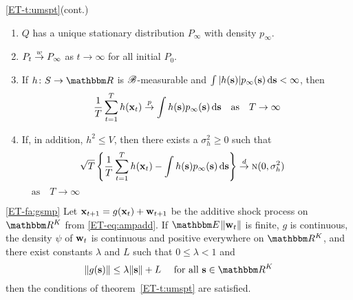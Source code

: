 \begin{frame}

    \vspace{2em}
    \Thm\eqref{ET-t:umspt}(cont.) 
    \begin{enumerate}
        \item $Q$ has a unique stationary distribution $P_\infty$ with
            density $p_\infty$.
        \item $P_t \stackrel { w } {\to} P_\infty$ as $t \to \infty$ for all initial $P_0$.
        \item  If $h \colon S \to \RR$ is $\mathscr B$-measurable 
            and $\int |h({\mathbf s})| p_{\infty}({\mathbf s})\mathop{}\!\mathrm{d} {\mathbf s} < \infty$,
            then
            \begin{equation}
                \label{eq:mllnr}
                \frac{1}{T} \sum_{t=1}^T h({\mathbf x}_t) 
                \stackrel { p } {\to} 
                \int h({\mathbf s}) p_{\infty}({\mathbf s}) \mathop{}\!\mathrm{d} {\mathbf s}
                \quad \text{as} \quad
                T \to \infty
            \end{equation}
        \item If, in addition, $h^2 \leq V$, then there exists a 
            $\sigma^2_h \geq 0$ such that 
            \begin{equation}
                \label{eq:mkclt}
                \sqrt{T}
                \left\{
                    \frac{1}{T} \sum_{t=1}^T h({\mathbf x}_t) -
                    \int h({\mathbf s}) p_{\infty}({\mathbf s}) \mathop{}\!\mathrm{d} {\mathbf s}
                \right\}
                \stackrel { d } {\to} \textrm{\sc n}(0, \sigma^2_h)
                \quad 
            \end{equation}
            $\quad \text{as}\quad 
                T \to \infty$
    \end{enumerate}
\end{frame}



\begin{frame}

    \vspace{2em}
    \Fact\eqref{ET-fa:gsmp}
        \label{fa:gsmp}
        Let ${\mathbf x}_{t+1} = g({\mathbf x}_t) + {\mathbf w}_{t+1}$ be the additive shock
        process on $\RR^K$ from \eqref{ET-eq:ampadd}.  If $\EE \|\boldw_t\|$ is
        finite, $g$ is continuous, the density $\psi$ of ${\mathbf w}_t$ is continuous
        and positive everywhere on $\RR^K$, and there exist constants $\lambda$
        and $L$ such that $0 \leq \lambda < 1$ and
        \begin{equation}
            \label{eq:drift}
            \| g(\bolds) \| \leq \lambda \| \bolds \| + L
            \quad \text{ for all } \bolds \in \RR^K
        \end{equation}
        then the conditions of theorem~\ref{ET-t:umspt} are satisfied.  
    
\end{frame}


